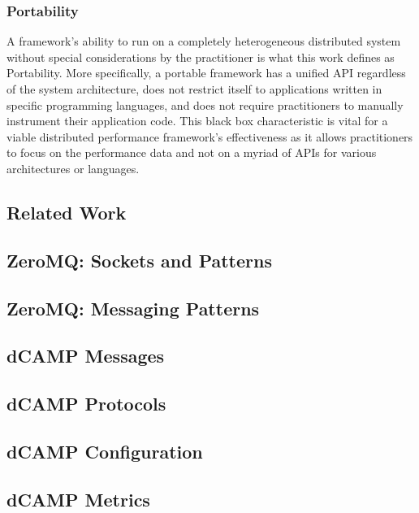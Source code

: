 \documentclass{beamer}
\begin{document}
\begin{frame}
\frametitle{Portability}
A framework's ability to run on a completely heterogeneous distributed system without special considerations by the
practitioner is what this work defines as Portability. More specifically, a portable framework has a unified API
regardless of the system architecture, does not restrict itself to applications written in specific programming
languages, and does not require practitioners to manually instrument their application code. This black box
characteristic is vital for a viable distributed performance framework's effectiveness as it allows practitioners to
focus on the performance data and not on a myriad of APIs for various architectures or languages.
\end{frame}

\subsection{Related Work}

\subsection{ZeroMQ: Sockets and Patterns}

\subsection{ZeroMQ: Messaging Patterns}

\subsection{dCAMP Messages}

\subsection{dCAMP Protocols}

\subsection{dCAMP Configuration}

\subsection{dCAMP Metrics}
\end{document}
